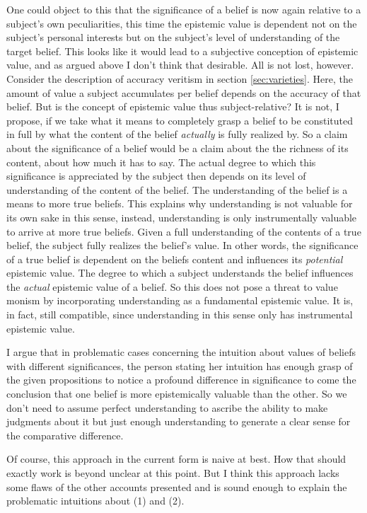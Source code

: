 \documentclass[12pt,numbers=noenddot]{scrartcl}
\begin{document}
One could object to this that the significance of a belief is now again relative to a subject's own peculiarities, this time the epistemic value is dependent not on the subject's personal interests but on the subject's level of understanding of the target belief. This looks like it would lead to a subjective conception of epistemic value, and as argued above I don't think that desirable. All is not lost, however. Consider the description of accuracy veritism in section \ref{sec:varieties}. Here, the amount of value a subject accumulates per belief depends on the accuracy of that belief. But is the concept of epistemic value thus subject-relative? It is not, I propose, if we take what it means to completely grasp a belief to be constituted in full by what the content of the belief \emph{actually} is fully realized by. So a claim about the significance of a belief would be a claim about the the richness of its content, about how much it has to say. The actual degree to which this significance is appreciated by the subject then depends on its level of understanding of the content of the belief. The understanding of the belief is a means to more true beliefs. This explains why understanding is not valuable for its own sake in this sense, instead, understanding is only instrumentally valuable to arrive at more true beliefs. Given a full understanding of the contents of a true belief, the subject fully realizes the belief's value. In other words, the significance of a true belief is dependent on the beliefs content and influences its \emph{potential} epistemic value. The degree to which a subject understands the belief influences the \emph{actual} epistemic value of a belief. So this does not pose a threat to value monism by incorporating understanding as a fundamental epistemic value. It is, in fact, still compatible, since understanding in this sense only has instrumental epistemic value.

I argue that in problematic cases concerning the intuition about values of beliefs with different significances, the person stating her intuition has enough grasp of the given propositions to notice a profound difference in significance to come the conclusion that one belief is more epistemically valuable than the other. So we don't need to assume perfect understanding to ascribe the ability to make judgments about it but just enough understanding to generate a clear sense for the comparative difference.

Of course, this approach in the current form is naive at best. How that should exactly work is beyond unclear at this point. But I think this approach lacks some flaws of the other accounts presented and is sound enough to explain the problematic intuitions about (1) and (2).
\end{document}
